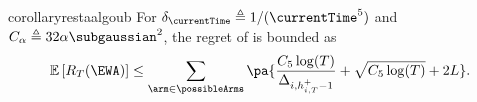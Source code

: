 \begin{restatable}{corollary}{restaalgoub}\label{dependent_theorem}
For $\delta_\currentTime \triangleq 1/(\currentTime^5)$ and $C_\alpha\triangleq 32\alpha\subgaussian^2$, the regret of \FEWA is  bounded as
\begin{align*}
\mathbb{E}\left[R_T(\EWA)\right]  \leq \sum_{\arm\in \possibleArms} \pa{\frac{C_{5}\log(T)}{\Delta_{i,h_{i,T}^+-1}}+ \sqrt{C_{5}\log(T)} + 2L}.
\end{align*}

\end{restatable}




